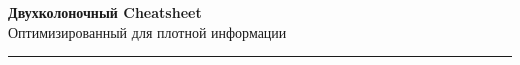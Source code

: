 \documentclass[10pt,landscape,a4paper]{article}
\begin{document}
\begin{center}
    {\Huge\bfseries Двухколоночный Cheatsheet}\\[0.5cm]
    {\large Оптимизированный для плотной информации}\\[0.3cm]
    \vspace{0.3cm}
    \rule{\textwidth}{1pt}
\end{center}

\providecommand{\contributors}{}
\newcommand{\contributorsDisplay}{%
  \if\relax\detokenize{\contributors}\relax
    ---
  \else
    \texttt{\contributors}
  \fi}
\end{document}
